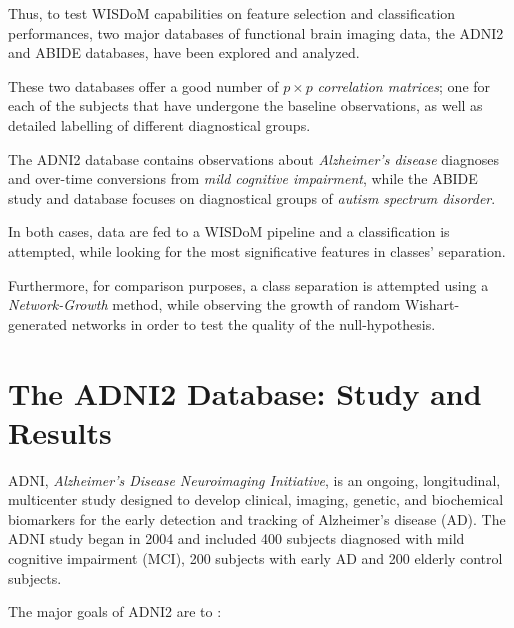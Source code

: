 \documentclass[12pt,openright,twoside,a4paper]{book}
\begin{document}
Thus, to test WISDoM capabilities on feature selection and classification performances, two major databases of functional brain imaging data, the ADNI2 and ABIDE databases, have been explored and analyzed.

These two databases offer a good number of $p\times p$ \textit{correlation matrices}; one for each of the subjects that have undergone the baseline observations, as well as detailed labelling of different diagnostical groups.

The ADNI2 database contains observations about \textit{Alzheimer's disease} diagnoses and over-time conversions from \textit{mild cognitive impairment}, while the ABIDE study and database focuses on diagnostical groups of \textit{autism spectrum disorder}.
\vspace{5mm}

In both cases, data are fed to a WISDoM pipeline and a classification is attempted, while looking for the most significative features in classes' separation.

Furthermore, for comparison purposes, a class separation is attempted using a \textit{Network-Growth} method, while observing  the growth of random Wishart-generated networks in order to test the quality of the null-hypothesis.
\clearpage

\section{The ADNI2 Database: Study and Results}

ADNI, \textit{Alzheimer's Disease Neuroimaging Initiative}, is an ongoing, longitudinal, multicenter study designed to develop clinical, imaging, genetic, and biochemical biomarkers for the early detection and tracking of Alzheimer’s disease (AD). The ADNI study began in 2004 and included 400 subjects diagnosed with mild cognitive impairment (MCI), 200 subjects with early AD and 200 elderly control subjects.

The major goals of ADNI2 are to \cite{Adni}:
\end{document}
